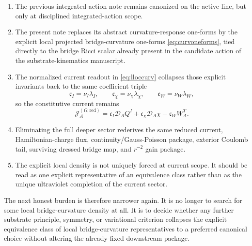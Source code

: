 \documentclass[11pt]{article}
\newcommand{\SpatialD}{\mathcal D}
\newcommand{\SourceCurrentRed}{\mathcal J^{(\Omega,\mathrm{red})}}
\begin{document}
\begin{enumerate}
    \item The previous integrated-action note remains canonized on the active line, but only at disciplined integrated-action scope.
    \item The present note replaces its abstract curvature-response one-forms by the explicit local projected bridge-curvature one-forms \eqref{eq:curvoneforms}, tied directly to the bridge Ricci scalar already present in the candidate action of the substrate-kinematics manuscript.
    \item The normalized current readout in \eqref{eq:lloccurv} collapses those explicit invariants back to the same coefficient triple
    \[
    \mathfrak c_I=\nu_I\lambda_I,
    \qquad
    \mathfrak c_\chi=\nu_\chi\lambda_\chi,
    \qquad
    \mathfrak c_W=\nu_W\lambda_W,
    \]
    so the constitutive current remains
    \[
    \SourceCurrentRed_A
    =
    \mathfrak c_I\SpatialD_AQ^I
    +\mathfrak c_\chi\SpatialD_A\chi
    +\mathfrak c_WW_A^T.
    \]
    \item Eliminating the full deeper sector rederives the same reduced current, Hamiltonian-charge flux, continuity/Gauss-Poisson package, exterior Coulomb tail, surviving dressed bridge map, and \(r^{-2}\) gain package.
    \item The explicit local density is not uniquely forced at current scope. It should be read as one explicit representative of an equivalence class rather than as the unique ultraviolet completion of the current sector.
\end{enumerate}

The next honest burden is therefore narrower again. It is no longer to search for some local bridge-curvature density at all. It is to decide whether any further substrate principle, symmetry, or variational criterion collapses the explicit equivalence class of local bridge-curvature representatives to a preferred canonical choice without altering the already-fixed downstream package.
\end{document}
